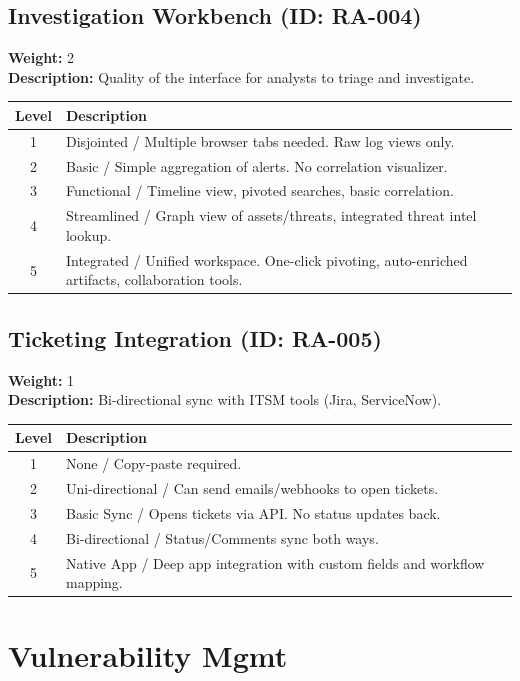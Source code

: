 \documentclass{article}
\begin{document}
\subsection{Investigation Workbench (ID: RA-004)}
\textbf{Weight:} 2 \\
\textbf{Description:} Quality of the interface for analysts to triage and investigate.
\vspace{0.3cm}
\begin{longtable}{|c|p{12cm}|}
\hline
\rowcolor{lightgray} \textbf{Level} & \textbf{Description} \\ \hline
1 & Disjointed / Multiple browser tabs needed. Raw log views only. \\ \hline
2 & Basic / Simple aggregation of alerts. No correlation visualizer. \\ \hline
3 & Functional / Timeline view, pivoted searches, basic correlation. \\ \hline
4 & Streamlined / Graph view of assets/threats, integrated threat intel lookup. \\ \hline
5 & Integrated / Unified workspace. One-click pivoting, auto-enriched artifacts, collaboration tools. \\ \hline
\end{longtable}
\vspace{0.5cm}
\subsection{Ticketing Integration (ID: RA-005)}
\textbf{Weight:} 1 \\
\textbf{Description:} Bi-directional sync with ITSM tools (Jira, ServiceNow).
\vspace{0.3cm}
\begin{longtable}{|c|p{12cm}|}
\hline
\rowcolor{lightgray} \textbf{Level} & \textbf{Description} \\ \hline
1 & None / Copy-paste required. \\ \hline
2 & Uni-directional / Can send emails/webhooks to open tickets. \\ \hline
3 & Basic Sync / Opens tickets via API. No status updates back. \\ \hline
4 & Bi-directional / Status/Comments sync both ways. \\ \hline
5 & Native App / Deep app integration with custom fields and workflow mapping. \\ \hline
\end{longtable}
\vspace{0.5cm}
\section{Vulnerability Mgmt}
\end{document}

